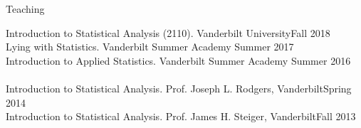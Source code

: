 \begin{rSection}{\textrm{Teaching}}
\begin{comment}
\hspace*{6 mm} \href{https://datascience4psych.github.io/DataScience4Psych/}{\color{blue} datascience4psych.github.io/DataScience4Psych}\hfill{Spring 2021\textsuperscript{*}; Spring 2022}\smallskip\\
Psychological Testing  (362). Wake Forest University \hfill{Spring 2020;\textsuperscript{*} \href{https://www.youtube.com/playlist?list=PLKrrdtYgOUYYgag4erySD7L0jDcZGMlS_}{\color{blue}Spring 2021\noteBns}}
\hspace* {6 mm} \href{https://r-computing-lab.github.io/psychtesting/}{\color{blue} r-computing-lab.github.io/psychtesting}\smallskip\\
Personality (255). Wake Forest University \hfill{Fall 2021; \href{https://www.youtube.com/playlist?list=PLKrrdtYgOUYZpENpYddjG8n_q3bfbx8Kr}{Fall 2022x2\noteBns}}\\
\hspace*{6 mm} \href{https://smasongarrison.github.io/personality/}{\color{blue} smasongarrison.github.io/personality}\hfill{Fall 2019; Spring 2020;\textsuperscript{*} \href{https://www.youtube.com/playlist?list=PLKrrdtYgOUYZpENpYddjG8n_q3bfbx8Kr}{\color{blue}Fall 2020x2\textsuperscript{*}\noteBns}}\smallskip\\
\hspace* {6 mm}\smallskip\\
\end{comment}
Introduction to Statistical Analysis (2110). Vanderbilt University\hfill {Fall 2018}\\
Lying with Statistics. Vanderbilt Summer Academy \hfill{Summer 2017}\\
Introduction to Applied Statistics. Vanderbilt Summer Academy \hfill{Summer 2016}\smallskip\\
\\
Introduction to Statistical Analysis. Prof. Joseph L. Rodgers, Vanderbilt\hfill{Spring 2014}\\
Introduction to Statistical Analysis. Prof. James H. Steiger, Vanderbilt\hfill{Fall 2013}%

\end{rSection}
